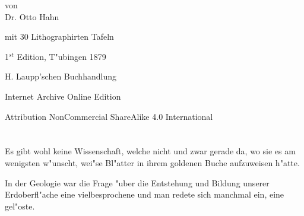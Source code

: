 \documentclass[a4paper, 11pt, oneside, german]{article}
\begin{document}
\begin{titlepage}
	
	{\Large von\\ \LARGE Dr. Otto Hahn\\} %
	
	\vspace*{1\baselineskip} %
	
    {\small mit 30 Lithographirten Tafeln} %
    

	
		
	\vspace*{\fill}%
	
	1$^{st}$ Edition, T"ubingen 1879 %
	
	{\small H. Laupp'schen Buchhandlung } %

	\vspace{1\baselineskip} %

    Internet Archive Online Edition  %
	
	{\small Attribution NonCommercial ShareAlike 4.0 International } %
\end{titlepage}
\setlength{\parskip}{1mm plus1mm minus1mm}
\setcounter{tocdepth}{2}
\setcounter{secnumdepth}{3}
\pagestyle{fancy}
\fancyhf{}
\cfoot{\frakfamily{\thepage}}
\tableofcontents
\clearpage
\listoffigures
\clearpage
\LARGE
\section*{}
\paragraph{}
Es gibt wohl keine Wissenschaft, welche nicht und zwar gerade da, wo sie es am wenigsten w"unscht, wei"se Bl"atter in ihrem goldenen Buche aufzuweisen h"atte.

In der Geologie war die Frage "uber die Entstehung und Bildung unserer Erdoberfl"ache eine vielbesprochene und man redete sich manchmal ein, eine gel"oste.
\end{document}
